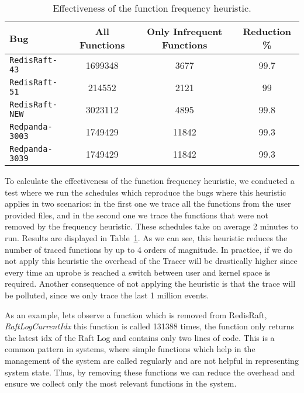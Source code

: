 \begin{table}[h]
	\scriptsize
	\centering
	\caption{Effectiveness of the function frequency heuristic.}
	\label{tab:function_frequency}
	\begin{tabular}{|l|c|c|c|}
		\hline
		\textbf{Bug}           & \textbf{All Functions} & \textbf{Only Infrequent Functions} & \textbf{Reduction \%} \\ \hline
		\texttt{RedisRaft-43}  & 1699348                & 3677                               & 99.7                  \\ \hline
		\texttt{RedisRaft-51}  & 214552                 & 2121                               & 99                    \\ \hline
		\texttt{RedisRaft-NEW} & 3023112                & 4895                               & 99.8                  \\ \hline
		\texttt{Redpanda-3003} & 1749429                & 11842                              & 99.3                  \\ \hline
		\texttt{Redpanda-3039} & 1749429                & 11842                              & 99.3                  \\ \hline
	\end{tabular}
\end{table}

To calculate the effectiveness of the function frequency heuristic, we conducted a test where we run the schedules which reproduce the bugs where this heuristic applies in two scenarios: in the first one we trace all the functions from the user provided files, and in the second one we trace the functions that were not removed by the frequency heuristic. These schedules take on average 2 minutes to run.
Results are displayed in Table~\ref{tab:function_frequency}.
As we can see, this heuristic reduces the number of traced functions by up to 4 orders of magnitude. In practice, if we do not apply this heuristic the overhead of the Tracer will be drastically higher since every time an uprobe is reached a switch between user and kernel space is required. Another consequence of not applying the heuristic is that the trace will be polluted, since we only trace the last 1 million events.

As an example, lets observe a function which is removed from RedisRaft, \textit{RaftLogCurrentIdx} this function is called 131388 times, the function only returns the latest idx of the Raft Log and contains only two lines of code. This is a common pattern in systems, where simple functions which help in the management of the system are called regularly and are not helpful in representing system state. Thus, by removing these functions we can reduce the overhead and ensure we collect only the most relevant functions in the system.

